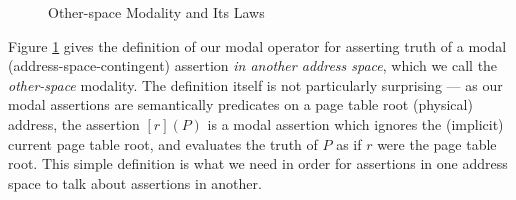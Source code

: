 \begin{figure}
  \caption{Other-space Modality and Its Laws}
  \label{fig:modaldef}
  \end{figure}
Figure \ref{fig:modaldef} gives the definition of our modal operator for asserting truth of a modal
(address-space-contingent) assertion \emph{in another address space}, which we call
the \emph{other-space} modality. The definition itself is not
particularly surprising --- as our modal assertions are semantically predicates on a page table root (physical)
address, the assertion $[r](P)$ is a modal assertion which ignores the (implicit) current page table root,
and evaluates the truth of $P$ as if $r$ were the page table root. This simple definition is 
what we need in order for assertions in one address space to talk about assertions in another.

